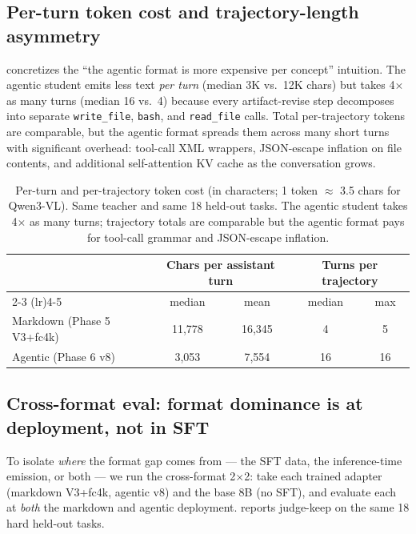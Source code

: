 \documentclass[11pt]{article}
\begin{document}
\subsection{Per-turn token cost and trajectory-length asymmetry}
\label{sec:token-budget}

 concretizes the ``the agentic format is more expensive per concept'' intuition. The agentic student emits less text \emph{per turn} (median 3K vs.\ 12K chars) but takes 4$\times$ as many turns (median 16 vs.\ 4) because every artifact-revise step decomposes into separate \texttt{write\_file}, \texttt{bash}, and \texttt{read\_file} calls. Total per-trajectory tokens are comparable, but the agentic format spreads them across many short turns with significant overhead: tool-call XML wrappers, JSON-escape inflation on file contents, and additional self-attention KV cache as the conversation grows.

\begin{table}[t]
\centering
\caption{Per-turn and per-trajectory token cost (in characters; 1 token $\approx$ 3.5 chars for Qwen3-VL). Same teacher and same 18 held-out tasks. The agentic student takes 4$\times$ as many turns; trajectory totals are comparable but the agentic format pays for tool-call grammar and JSON-escape inflation.}
\label{tab:token-budget}
\small
\begin{tabular}{lcccc}
\toprule
& \multicolumn{2}{c}{Chars per assistant turn} & \multicolumn{2}{c}{Turns per trajectory} \\
\cmidrule(lr){2-3} \cmidrule(lr){4-5}
& median & mean & median & max \\
\midrule
Markdown (Phase 5 V3+fc4k) & 11{,}778 & 16{,}345 & 4 & 5 \\
Agentic (Phase 6 v8) & \phantom{0}3{,}053 & \phantom{0}7{,}554 & 16 & 16 \\
\bottomrule
\end{tabular}
\end{table}

\subsection{Cross-format eval: format dominance is at deployment, not in SFT}
\label{sec:crossformat}

To isolate \emph{where} the format gap comes from --- the SFT data, the inference-time emission, or both --- we run the cross-format 2$\times$2: take each trained adapter (markdown V3+fc4k, agentic v8) and the base 8B (no SFT), and evaluate each at \emph{both} the markdown and agentic deployment.  reports judge-keep on the same 18 hard held-out tasks.
\end{document}

